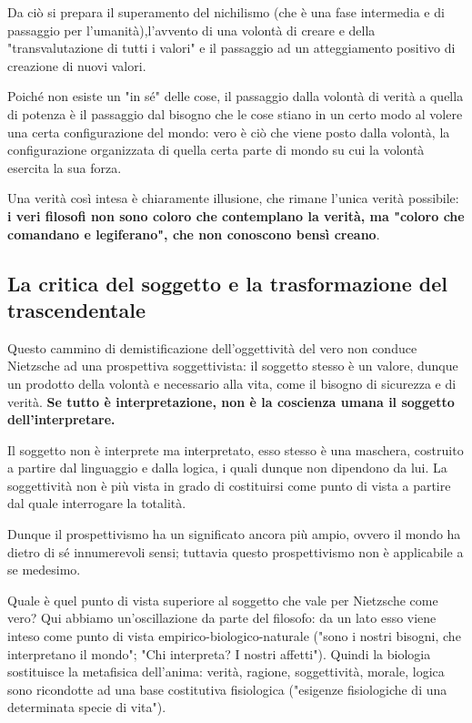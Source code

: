 Da ciò si prepara il superamento del nichilismo (che è una fase intermedia e di passaggio per l'umanità),l'avvento di una volontà di creare e della "transvalutazione di tutti i valori" e il passaggio ad un atteggiamento positivo di creazione di nuovi valori.

Poiché non esiste un "in sé" delle cose, il passaggio dalla volontà di verità a quella di potenza è il passaggio dal bisogno che le cose stiano in un certo modo al volere una certa configurazione del mondo: vero è ciò che viene posto dalla volontà, la configurazione organizzata di quella certa parte di mondo su cui la volontà esercita la sua forza.

Una verità così intesa è chiaramente illusione, che rimane l'unica verità possibile: \textbf{i veri filosofi non sono coloro che contemplano la verità, ma "coloro che comandano e legiferano", che non conoscono bensì creano}.

\subsection{La critica del soggetto e la trasformazione del trascendentale}

Questo cammino di demistificazione dell'oggettività del vero non conduce Nietzsche ad una prospettiva soggettivista: il soggetto stesso è un valore, dunque un prodotto della volontà e necessario alla vita, come il bisogno di sicurezza e di verità.\textbf{ Se tutto è interpretazione, non è la coscienza umana il soggetto dell'interpretare.}

Il soggetto non è interprete ma interpretato, esso stesso è una maschera, costruito a partire dal linguaggio e dalla logica, i quali dunque non dipendono da lui. La soggettività non è più vista in grado di costituirsi come punto di vista a partire dal quale interrogare la totalità.

Dunque il prospettivismo ha un significato ancora più ampio, ovvero il mondo ha dietro di sé innumerevoli sensi; tuttavia questo prospettivismo non è applicabile a se medesimo.

Quale è quel punto di vista superiore al soggetto che vale per Nietzsche come vero? Qui abbiamo un'oscillazione da parte del filosofo: da un lato esso viene inteso come punto di vista empirico-biologico-naturale ("sono i nostri bisogni, che interpretano il mondo"; "Chi interpreta? I nostri affetti"). Quindi la biologia sostituisce la metafisica dell'anima: verità, ragione, soggettività, morale, logica sono ricondotte ad una base costitutiva fisiologica ("esigenze fisiologiche di una determinata specie di vita").

